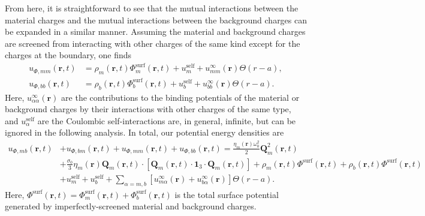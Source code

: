 \documentclass{article}
\begin{document}
From here, it is straightforward to see that the mutual interactions between the material charges and the mutual interactions between the background charges can be expanded in a similar manner. Assuming the material and background charges are screened from interacting with other charges of the same kind except for the charges at the boundary, one finds
\begin{equation}
\begin{split}
u_{\Phi,mm}(\mathbf{r},t) &= \rho_m(\mathbf{r},t)\Phi_m^\mathrm{surf}(\mathbf{r},t) + u_m^\mathrm{self} + u_{mm}^\infty(\mathbf{r})\Theta(r - a),\\
u_{\Phi,bb}(\mathbf{r},t) &= \rho_b(\mathbf{r},t)\Phi_b^\mathrm{surf}(\mathbf{r},t) + u_b^\mathrm{self} + u_{bb}^\infty(\mathbf{r})\Theta(r - a).
\end{split}
\end{equation}
Here, $u_{\alpha\alpha}^\infty(\mathbf{r})$ are the contributions to the binding potentials of the material or background charges by their interactions with other charges of the same type, and $u_\alpha^\mathrm{self}$ are the Coulombic self-interactions are, in general, infinite, but can be ignored in the following analysis. In total, our potential energy densities are
\begin{equation}
\begin{split}
u_{\Phi,mb}(\mathbf{r},t) &+ u_{\Phi,bm}(\mathbf{r},t) + u_{\Phi,mm}(\mathbf{r},t) + u_{\Phi,bb}(\mathbf{r},t) = \frac{\eta_m(\mathbf{r})\omega_0^2}{2}\mathbf{Q}_m^2(\mathbf{r},t)\\
&+ \frac{\sigma_0}{3}\eta_m(\mathbf{r})\mathbf{Q}_m(\mathbf{r},t)\cdot\left[\mathbf{Q}_m(\mathbf{r},t)\cdot\bm{1}_3\cdot\mathbf{Q}_m(\mathbf{r},t)\right] + \rho_m(\mathbf{r},t)\Phi^\mathrm{surf}(\mathbf{r},t) + \rho_b(\mathbf{r},t)\Phi^\mathrm{surf}(\mathbf{r},t)\\
&+ u_m^\mathrm{self} + u_b^\mathrm{self} + \sum_{\alpha = m,b}\left[u_{m\alpha}^\infty(\mathbf{r}) + u_{b\alpha}^\infty(\mathbf{r})\right]\Theta(r - a).
\end{split}
\end{equation}
Here, $\Phi^\mathrm{surf}(\mathbf{r},t) = \Phi_m^\mathrm{surf}(\mathbf{r},t) + \Phi_b^\mathrm{surf}(\mathbf{r},t)$ is the total surface potential generated by imperfectly-screened material and background charges.
\end{document}
